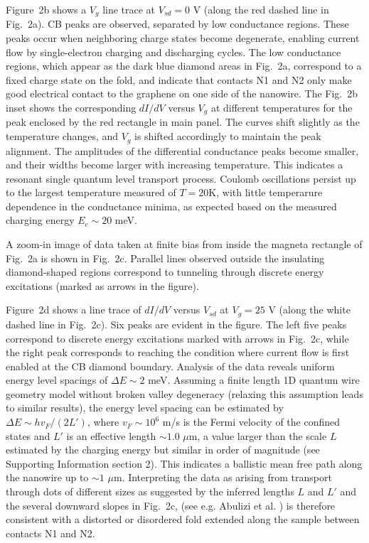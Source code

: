 \documentclass[journal=jacsat,manuscript=article]{achemso}
\begin{document}
Figure~2b shows a $V_g$ line trace at $V_{sd} = 0$ V (along the red dashed line in Fig.~2a). CB peaks are observed, separated by low conductance regions. These peaks occur when neighboring charge states become degenerate, enabling current flow by single-electron charging and discharging cycles. The low conductance regions, which appear as the dark blue diamond areas in Fig.~2a, correspond to a fixed charge state on the fold, and indicate that contacts N1 and N2 only make good electrical contact to the graphene on one side of the nanowire. The Fig.~2b inset shows the corresponding $dI/dV$ versus $V_g$ at different temperatures for the peak enclosed by the red rectangle in main panel. The curves shift slightly as the temperature changes, and $V_g$ is shifted accordingly to maintain the peak alignment. The amplitudes of the differential conductance peaks become smaller, and their widths become larger with increasing temperature. This indicates a resonant single quantum level transport process\cite{Kouwenhoven1997}. Coulomb oscillations persist up to the largest temperature measured of $T= 20$K, with little temperarure dependence in the conductance minima, as expected based on the measured charging energy $E_{c} \sim 20$ meV.

A zoom-in image of data taken at finite bias from inside the magneta rectangle of Fig.~2a is shown in Fig.~2c. Parallel lines observed outside the insulating diamond-shaped regions correspond to tunneling through discrete energy excitations (marked as arrows in the figure). 

Figure~2d shows a line trace of $dI/dV$ versus $V_{sd}$ at $V_{g}=25$ V (along the white dashed line in Fig.~2c). Six peaks are evident in the figure. The left five peaks correspond to discrete energy excitations marked with arrows in Fig.~2c, while the right peak corresponds to reaching the condition where current flow is first enabled at the CB diamond boundary. Analysis of the data \cite{Kouwenhoven1997} reveals uniform energy level spacings of $\Delta E\sim 2$ meV. Assuming a finite length 1D quantum wire geometry model without broken valley degeneracy (relaxing this assumption leads to similar results), the energy level spacing can be estimated by $\Delta E\sim h v_F/(2L')$, where $v_F\sim 10^6$ m/s is the Fermi velocity of the confined states and $L'$ is an effective length $\sim 1.0$ $\mu$m, a value larger than the scale $L$ estimated by the charging energy but similar in order of magnitude (see Supporting Information section 2). This indicates a ballistic mean free path along the nanowire up to  $\sim 1$ $\mu$m. Interpreting the data as arising from transport through dots of different sizes as suggested by the inferred lengths $L$ and $L'$ and the several downward slopes in Fig.~2c, (see e.g. Abulizi et al. \cite{abulizi_full_2016}) is therefore consistent with a distorted or disordered fold extended along the sample between contacts N1 and N2.
\end{document}
